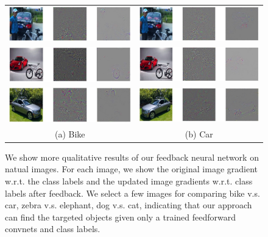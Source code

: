 \setlength{\tabcolsep}{2pt}
\begin{figure}
\begin{center}
\begin{tabular}{cc}
\includegraphics[width=0.45\linewidth]{figs/examples/bic-car1_bike} &
\includegraphics[width=0.45\linewidth]{figs/examples/bic-car1_car} \\
\includegraphics[width=0.45\linewidth]{figs/examples/bic-car2_bike} &
\includegraphics[width=0.45\linewidth]{figs/examples/bic-car2_car} \\
\includegraphics[width=0.45\linewidth]{figs/examples/bic-car3_bike} &
\includegraphics[width=0.45\linewidth]{figs/examples/bic-car3_car} \\ 
{\small (a) Bike} &
{\small (b) Car} \\
\end{tabular}
\caption{We show more qualitative results of our feedback neural network on natual images. For each image, we show the original image gradient w.r.t. the class labels and the updated image gradients w.r.t. class labels after feedback. We select a few images for comparing bike v.s. car, zebra v.s. elephant, dog v.s. cat, indicating that our approach can find the targeted objects given only a trained feedforward convnets and class labels.} 
\label{fig:examples}
\end{center}
\end{figure}
